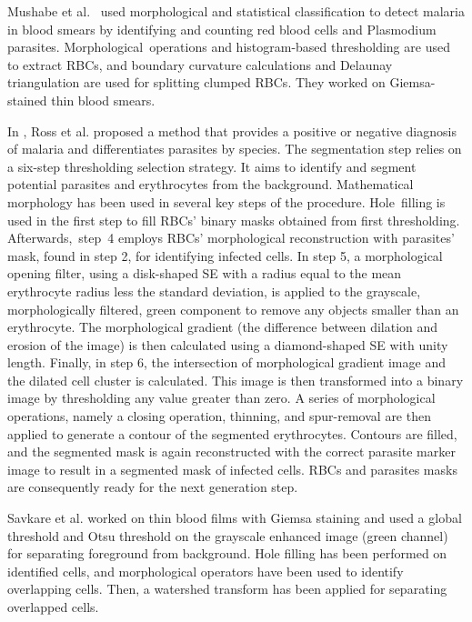 Mushabe et al.~\cite{Mushabe2013} used morphological and statistical classification to detect malaria in blood smears by identifying and counting red blood cells and Plasmodium parasites. Morphological~operations and histogram-based thresholding are used to extract RBCs, and boundary curvature calculations and Delaunay triangulation are used for splitting clumped RBCs. They worked on Giemsa-stained thin blood smears.

In \cite{Ross2006}, Ross et al. proposed a method that provides a positive or negative diagnosis of malaria and differentiates parasites by species. The segmentation step relies on a six-step thresholding selection strategy. It aims to identify and segment potential parasites and erythrocytes from the background. Mathematical morphology has been used in several key steps of the procedure. Hole~filling is used in the first step to fill RBCs' binary masks obtained from first thresholding. \mbox{Afterwards, step 4} employs RBCs' morphological reconstruction with parasites' mask, found in step 2, for identifying infected cells. In step 5, a morphological opening filter, using a disk-shaped SE with a radius equal to the mean erythrocyte radius less the standard deviation, is applied to the grayscale, morphologically filtered, green component to remove any objects smaller than an erythrocyte. The morphological gradient (the difference between dilation and erosion of the image) is then calculated using a diamond-shaped SE with unity length.
Finally, in step 6, the intersection of morphological gradient image and the dilated cell cluster is calculated. This image is then transformed into a binary image by thresholding any value greater than zero. A series of morphological operations, namely a closing operation, thinning, and spur-removal are then applied to generate a contour of the segmented erythrocytes. Contours are filled, and the segmented mask is again reconstructed with the correct parasite marker image to result in a segmented mask of infected cells. RBCs and parasites masks are consequently ready for the next generation step.

Savkare et al. \cite{Savkare2011b} worked on thin blood films with Giemsa staining and used a global threshold and Otsu threshold \cite{Otsu} on the grayscale enhanced image (green channel) for separating foreground from background. Hole filling has been performed on identified cells, and morphological operators have been used to identify overlapping cells. Then, a watershed transform has been applied for separating overlapped cells.

